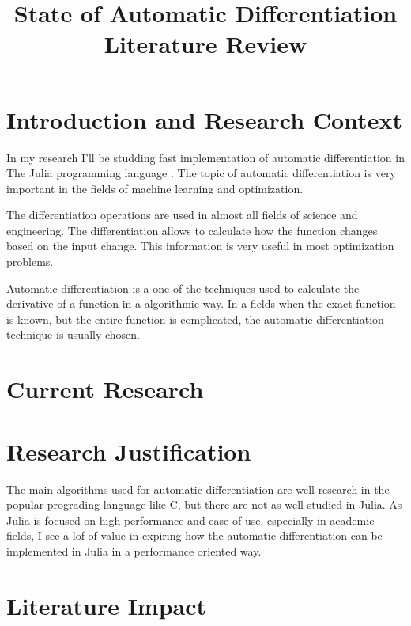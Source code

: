 \documentclass[conference,a4paper]{IEEEtran}
\begin{document}
\title{State of Automatic Differentiation\\ Literature Review}

\author{
}

\maketitle


\section{Introduction and Research Context}

In my research I'll be studding fast implementation of automatic differentiation in The Julia programming language \cite{JuliaLanguage:Homepage}.
The topic of automatic differentiation is very important in the fields of machine learning and optimization.

The differentiation operations are used in almost all fields of science and engineering.
The differentiation allows to calculate how the function changes based on the input change.
This information is very useful in most optimization problems.

Automatic differentiation is a one of the techniques used to calculate the derivative of a function in a algorithmic way.
In a fields when the exact function is known, but the entire function is complicated, the automatic differentiation technique is usually chosen.


\section{Current Research}

\section{Research Justification}
The main algorithms used for automatic differentiation are well research in the popular prograding language like C, but there are not as well studied in Julia.
As Julia is focused on high performance and ease of use, especially in academic fields, I see a lof of value in expiring how the automatic differentiation can be implemented in Julia in a performance oriented way.

\section{Literature Impact}



\end{document}
